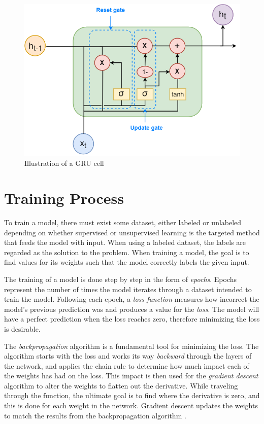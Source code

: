 \documentclass[nofilelist]{cslthse-msc}
\begin{document}
\begin{figure}[!ht]
    \centering
    \includegraphics[scale=0.58]{msccls/explanatory_images/gru.png}
    \caption{Illustration of a GRU cell}
    \label{fig:gru_node}
\end{figure}


\section{Training Process}





To train a model, there must exist some dataset, either labeled or unlabeled depending on whether supervised or unsupervised learning is the targeted method that feeds the model with input. When using a labeled dataset, the labels are regarded as the solution to the problem. When training a model, the goal is to find values for its weights such that the model correctly labels the given input. 

The training of a model is done step by step in the form of \textit{epochs}. Epochs represent the number of times the model iterates through a dataset intended to train the model. Following each epoch, a \textit{loss function} measures how incorrect the model's previous prediction was and produces a value for the \textit{loss}. The model will have a perfect prediction when the loss reaches zero, therefore minimizing the loss is desirable. 

The \textit{backpropagation} algorithm is a fundamental tool for minimizing the loss. The algorithm starts with the loss and works its way \textit{backward} through the layers of the network, and applies the chain rule to determine how much impact each of the weights has had on the loss. This impact is then used for the \textit{gradient descent} algorithm to alter the weights to flatten out the derivative. While traveling through the function, the ultimate goal is to find where the derivative is zero, and this is done for each weight in the network. Gradient descent updates the weights to match the results from the backpropagation algorithm \citep{franoischollet2017learning}. 
\end{document}
